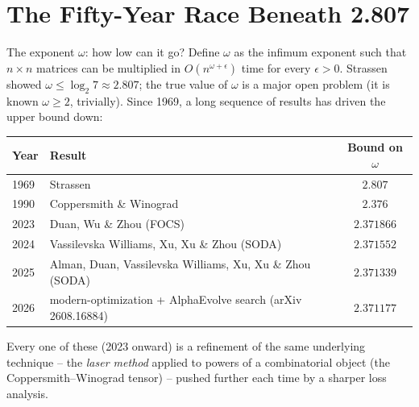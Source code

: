 \documentclass[11pt,aspectratio=169]{beamer}
\begin{document}
\section{The Fifty-Year Race Beneath 2.807}

\begin{frame}{The exponent $\omega$: how low can it go?}
  \small
  Define $\omega$ as the infimum exponent such that $n\times n$ matrices can be multiplied
  in $O(n^{\omega+\epsilon})$ time for every $\epsilon > 0$. Strassen showed $\omega \le
  \log_2 7 \approx 2.807$; the true value of $\omega$ is a major open problem (it is known
  $\omega \ge 2$, trivially). Since 1969, a long sequence of results has driven the upper
  bound down:
  \begin{center}
  \begin{tabular}{@{}llc@{}}
    \toprule
    Year & Result & Bound on $\omega$ \\
    \midrule
    1969 & Strassen & $2.807$ \\
    1990 & Coppersmith \& Winograd & $2.376$ \\
    2023 & Duan, Wu \& Zhou (FOCS) & $2.371866$ \\
    2024 & Vassilevska Williams, Xu, Xu \& Zhou (SODA) & $2.371552$ \\
    2025 & Alman, Duan, Vassilevska Williams, Xu, Xu \& Zhou (SODA) & $2.371339$ \\
    2026 & modern-optimization + AlphaEvolve search (arXiv 2608.16884) & $2.371177$ \\
    \bottomrule
  \end{tabular}
  \end{center}
  Every one of these (2023 onward) is a refinement of the same underlying technique --
  the \emph{laser method} applied to powers of a combinatorial object (the
  Coppersmith--Winograd tensor) -- pushed further each time by a sharper loss analysis.
\end{frame}
\end{document}
